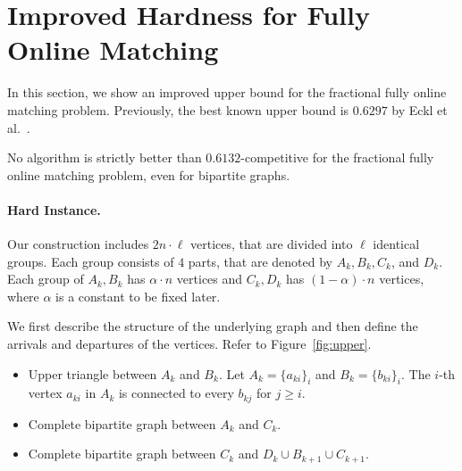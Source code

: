 \section{Improved Hardness for Fully Online Matching}
\label{sec:fully_upper}

In this section, we show an improved upper bound for the fractional fully online matching problem. Previously, the best known upper bound is $0.6297$ by Eckl et al.~\cite{orl/EcklKLS21}. 

\begin{theorem}
No algorithm is strictly better than $0.6132$-competitive for the fractional fully online matching problem, even for bipartite graphs.
\end{theorem}

\paragraph{Hard Instance.} Our construction includes $2n \cdot \ell$ vertices, that are divided into $\ell$ identical groups. Each group consists of $4$ parts, that are denoted by $A_k, B_k, C_k$, and $D_k$. Each group of $A_k, B_k$ has $\alpha \cdot n$ vertices and $C_k, D_k$ has $(1-\alpha) \cdot n$ vertices, where $\alpha$ is a constant to be fixed later.

We first describe the structure of the underlying graph and then define the arrivals and departures of the vertices. Refer to Figure~\ref{fig:upper}.


\begin{itemize}
    \item Upper triangle between $A_k$ and $B_k$. Let $A_k = \{a_{ki}\}_{i}$ and $B_k = \{b_{ki}\}_{i}$. The $i$-th vertex $a_{ki}$ in $A_k$ is connected to every $b_{kj}$ for $j\geq i$.
    \item Complete bipartite graph between $A_k$ and $C_k$. 
    \item Complete bipartite graph between $C_k$ and $D_k \cup B_{k+1} \cup C_{k+1}$.
\end{itemize}
 
